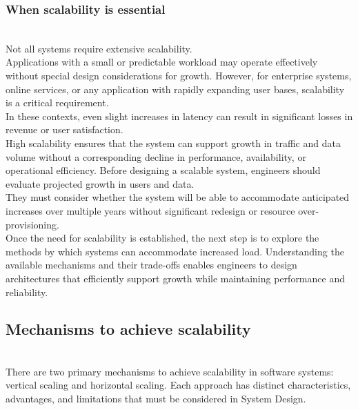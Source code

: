 \subsubsection{When scalability is essential}\label{WI5eOINZDHWqBruVDfz0T}
\\
Not all systems require extensive scalability.
\\
Applications with a small or predictable workload may operate effectively without special design considerations for growth. However, for enterprise systems, online services, or any application with rapidly expanding user bases, scalability is a critical requirement.
\\
In these contexts, even slight increases in latency can result in significant losses in revenue or user satisfaction.
\\
High scalability ensures that the system can support growth in traffic and data volume without a corresponding decline in performance, availability, or operational efficiency. Before designing a scalable system, engineers should evaluate projected growth in users and data.
\\
They must consider whether the system will be able to accommodate anticipated increases over multiple years without significant redesign or resource over-provisioning.
\\
Once the need for scalability is established, the next step is to explore the methods by which systems can accommodate increased load. Understanding the available mechanisms and their trade-offs enables engineers to design architectures that efficiently support growth while maintaining performance and reliability.

\subsection{Mechanisms to achieve scalability}\label{_LwbI30CE5U6enBvlu8G8}
\\
There are two primary mechanisms to achieve scalability in software systems: vertical scaling and horizontal scaling. Each approach has distinct characteristics, advantages, and limitations that must be considered in System Design.

